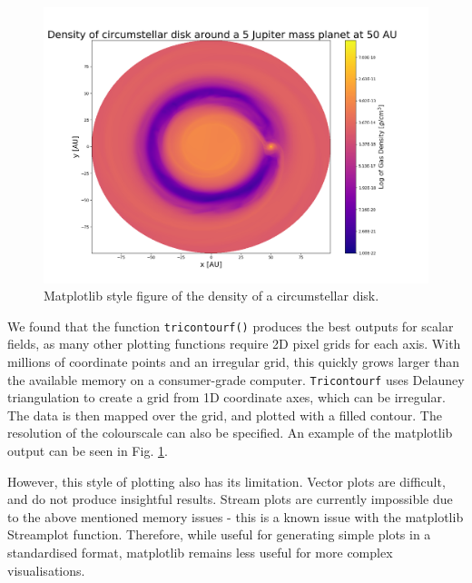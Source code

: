 \documentclass[preprint2]{aastex62}
\begin{document}
\begin{figure}
	\includegraphics[width=\linewidth]{figures/Presentation/mpl.png}
	\caption{\label{fig:mpl}Matplotlib style figure of the density of a circumstellar disk.}
\end{figure}  

We found that the function \verb|tricontourf()| produces the best outputs for scalar fields, as many other plotting functions require 2D pixel grids for each axis. 
With millions of coordinate points and an irregular grid, this quickly grows larger than the available memory on a consumer-grade computer.
\verb|Tricontourf| uses Delauney triangulation to create a grid from 1D coordinate axes, which can be irregular. The data is then mapped over the grid, and plotted with a filled contour. The resolution of the colourscale can also be specified. 
An example of the matplotlib output can be seen in Fig. \ref{fig:mpl}.

However, this style of plotting also has its limitation. 
Vector plots are difficult, and do not produce insightful results.
Stream plots are currently impossible due to the above mentioned memory issues - this is a known issue with the matplotlib Streamplot function.
Therefore, while useful for generating simple plots in a standardised format, matplotlib remains less useful for more complex visualisations.
\end{document}
